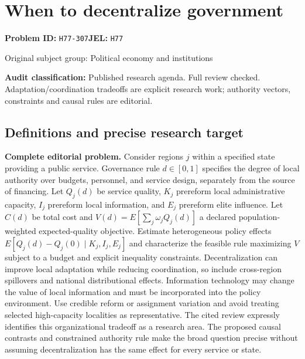 \documentclass[11pt,a4paper]{article}
\begin{document}
\section*{When to decentralize government}
\textbf{Problem ID:} \texttt{H77-307}\quad \textbf{JEL:} \texttt{H77}\par
\label{problem:OP-0386}
{\sffamily\small\color{muted}Original subject group: Political economy and institutions\par}
\label{definitions:problem:30007668}
\textbf{Audit classification:} Published research agenda. Full review checked. Adaptation/coordination tradeoffs are explicit research work; authority vectors, constraints and causal rules are editorial.
\subsection*{Definitions and precise research target}
\textbf{Complete editorial problem.} Consider regions \(j\) within a specified state providing a public service. Governance rule \(d\in[0,1]\) specifies the degree of local authority over budgets, personnel, and service design, separately from the source of financing. Let \(Q_j(d)\) be service quality, \(K_j\) prereform local administrative capacity, \(I_j\) prereform local information, and \(E_j\) prereform elite influence. Let \(C(d)\) be total cost and \(V(d)=E[\sum_j\omega_jQ_j(d)]\) a declared population-weighted expected-quality objective. Estimate heterogeneous policy effects \(E[Q_j(d)-Q_j(0)\mid K_j,I_j,E_j]\) and characterize the feasible rule maximizing \(V\) subject to a budget and explicit inequality constraints. Decentralization can improve local adaptation while reducing coordination, so include cross-region spillovers and national distributional effects. Information technology may change the value of local information and must be incorporated into the policy environment. Use credible reform or assignment variation and avoid treating selected high-capacity localities as representative. The cited review expressly identifies this organizational tradeoff as a research area. The proposed causal contrasts and constrained authority rule make the broad question precise without assuming decentralization has the same effect for every service or state.
\end{document}
